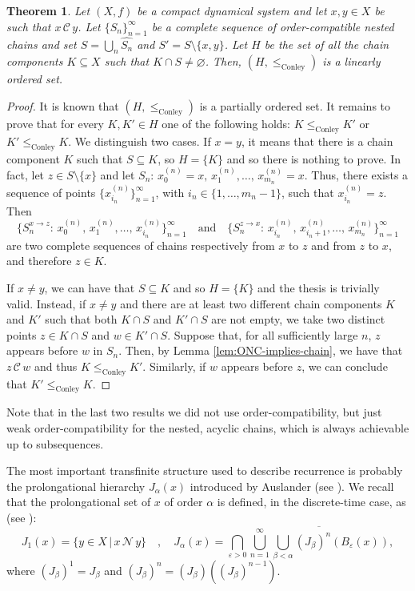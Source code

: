 \documentclass[10pt,a4paper]{article}
\theoremstyle{definition}
\theoremstyle{remark}
\theoremstyle{plain}
\newtheorem{thm}[defi]{Theorem}
\begin{document}
\begin{thm}\label{conley_}
    Let $(X,f)$ be a compact dynamical system and let $x,y\in X$ be such that $x\,\mathcal{C}\,y$. Let $\{S_n\}_{n=1}^\infty$ be a complete sequence of order-compatible nested chains and set $S=\bigcup_n\widehat{S_n}$ and $S'=S\setminus\{x,y\}$. Let $H$ be the set of all the chain components $K\subseteq X$ such that $K\cap S\neq\varnothing$.
    Then, $(H,\le_\mathrm{Conley})$ is a linearly ordered set.
\end{thm}



\begin{proof}
    It is known that  $(H,\le_{\mathrm{Conley}})$ is a partially ordered set. It remains to prove that for every $K, K'\in H$ one of the following holds: $K\le_{\mathrm{Conley}}K'$ or $K'\le_{\mathrm{Conley}}K$.
    We distinguish two cases.
    If $x=y$, it means that there is a chain component $K$ such that $S\subseteq K$, so $H=\{K\}$ and so there is nothing to prove. In fact, let $z\in S\setminus\{x\}$ and let $S_n:\,x_0^{(n)}=x,\,x_1^{(n)},\dots,\,x_{m_n}^{(n)}=x$. Thus, there exists a sequence of points $\{x_{i_n}^{(n)}\}_{n=1}^\infty$, with $i_n\in\{1,\dots,m_n-1\}$, such that $x_{i_n}^{(n)}=z$. Then
    $$\{S_n^{x\to z}:\,x_0^{(n)},\,x_1^{(n)},\dots,\,x_{i_n}^{(n)}\}_{n=1}^\infty\quad\text{and}\quad\{S_n^{z\to x}:\,x_{i_n}^{(n)},\,x_{i_n+1}^{(n)},\dots,\,x_{m_n}^{(n)}\}_{n=1}^\infty$$
    are two complete sequences of chains respectively from $x$ to $z$ and from $z$ to $x$, and therefore $z\in K$.
    
    If $x\ne y$, we can have that $S\subseteq K$ and so $H=\{K\}$ and the thesis is trivially valid. Instead, if $x\ne y$ and there are at least two different chain components $K$ and $K'$ such that both $K\cap S$ and $K'\cap S$ are not empty, we
    take two distinct points $z\in K\cap S$ and $w\in K'\cap S$. Suppose that, for all sufficiently large $n$, $z$ appears before $w$ in $S_n$. Then, by Lemma \ref{lem:ONC-implies-chain}, we have that $z\,\mathcal{C}\,w$ and thus $K\le_{\mathrm{Conley}}K'$. Similarly, if $w$ appears before $z$, we can conclude that $K'\le_{\mathrm{Conley}} K$. 
\end{proof}
Note that in the last two results we did not use order-compatibility, but just weak order-compatibility for the nested, acyclic chains, which is always achievable up to subsequences.

\bigskip

The most important transfinite structure used to describe recurrence is probably the prolongational hierarchy $J_\alpha(x)$ introduced by Auslander (see \cite{Auslander}). We recall that the prolongational set of $x$ of order $\alpha$ is defined, in the discrete-time case, as (see \cite{Viscovini}):
\begin{equation}
J_1(x)=\{y\in X\,|\,x\,\mathcal{N}\,y\}\quad,\quad
   J_\alpha(x) = \bigcap_{\varepsilon > 0} \overline{ \bigcup_{n=1}^\infty \bigcup_{\beta < \alpha} (J_\beta)^n(B_\varepsilon(x)) },
\end{equation}
where $(J_\beta)^1=J_\beta$ and $(J_\beta)^n=(J_\beta)((J_\beta)^{n-1})$.
\end{document}
